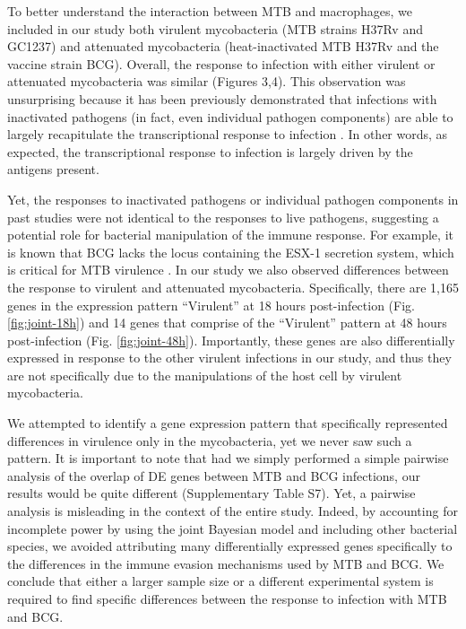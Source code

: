 To better understand the interaction between MTB and macrophages, we
included in our study both virulent mycobacteria (MTB strains H37Rv and
GC1237) and attenuated mycobacteria (heat-inactivated MTB H37Rv and the
vaccine strain BCG). Overall, the response to infection with either
virulent or attenuated mycobacteria was similar (Figures 3,4). This
observation was unsurprising because it has been previously demonstrated
that infections with inactivated pathogens (in fact, even individual
pathogen components) are able to largely recapitulate the
transcriptional response to infection \citep{Huang2001, Boldrick2002,
Nau2002, Jenner2005}. In other words, as expected, the
transcriptional response to infection is largely driven by the antigens
present.

Yet, the responses to inactivated pathogens or individual pathogen
components in past studies were not identical to the responses to live
pathogens, suggesting a potential role for bacterial manipulation of the
immune response. For example, it is known that BCG lacks the locus
containing the ESX-1 secretion system, which is critical for MTB
virulence \citep{Behr1999, Pym2002, Hsu2003, Simeone2009}. In our
study we also observed differences between the response to virulent and
attenuated mycobacteria. Specifically, there are 1,165 genes in the
expression pattern ``Virulent'' at 18 hours post-infection (Fig. \ref{fig:joint-18h})
and 14 genes that comprise of the ``Virulent'' pattern at 48 hours
post-infection (Fig. \ref{fig:joint-48h}). Importantly, these genes are also
differentially expressed in response to the other virulent infections in
our study, and thus they are not specifically due to the manipulations
of the host cell by virulent mycobacteria.

We attempted to identify a gene expression pattern that specifically
represented differences in virulence only in the mycobacteria, yet we
never saw such a pattern. It is important to note that had we simply
performed a simple pairwise analysis of the overlap of DE genes between
MTB and BCG infections, our results would be quite different
(Supplementary Table S7). Yet, a pairwise analysis is misleading in the
context of the entire study. Indeed, by accounting for incomplete power
by using the joint Bayesian model and including other bacterial species,
we avoided attributing many differentially expressed genes specifically
to the differences in the immune evasion mechanisms used by MTB and BCG.
We conclude that either a larger sample size or a different experimental
system is required to find specific differences between the response to
infection with MTB and BCG.

